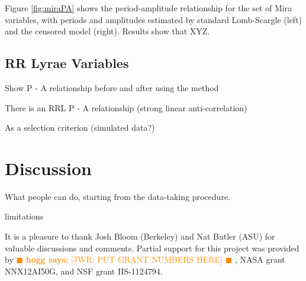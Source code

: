 \documentclass[12pt,preprint]{aastex}
\newcommand{\hogg}[1] { \textcolor{darkorange} {
\ensuremath{\blacksquare} {\bf hogg says:}  {#1}
\ensuremath{\blacksquare} } }
\begin{document}
Figure \ref{fig:miraPA} shows the period-amplitude relationship for the set of Mira variables, with periods and amplitudes estimated by standard Lomb-Scargle (left) and the censored model (right).  Results show that XYZ.
 



 \subsection{RR Lyrae Variables}

  Show P - A relationship before and after using the method

There is an RRL P - A relationship (strong linear anti-correlation)

As a selection criterion (simulated data?)


\section{Discussion}
\label{sec:discussion}

What people can do, starting from the data-taking procedure.

limitations


\acknowledgements It is a pleasure to thank
%
  Josh Bloom (Berkeley) and
  Nat Butler (ASU)
%
for valuable discussions and comments.
%
Partial support for this project was provided by \hogg{[JWR: PUT GRANT
  NUMBERS HERE]}, NASA grant NNX12AI50G, and NSF grant IIS-1124794.


\end{document}
